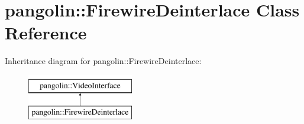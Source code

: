 \hypertarget{classpangolin_1_1_firewire_deinterlace}{}\section{pangolin\+:\+:Firewire\+Deinterlace Class Reference}
\label{classpangolin_1_1_firewire_deinterlace}
Inheritance diagram for pangolin\+:\+:Firewire\+Deinterlace\+:\begin{figure}[H]
\begin{center}
\leavevmode
\includegraphics[height=2.000000cm]{classpangolin_1_1_firewire_deinterlace}
\end{center}
\end{figure}
